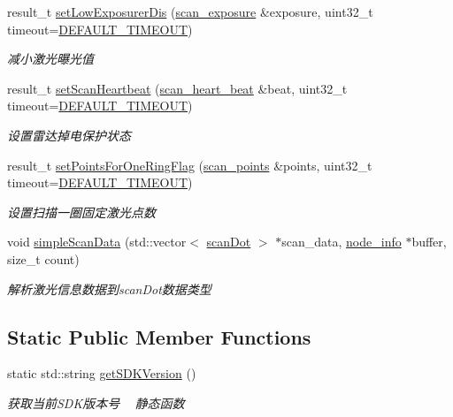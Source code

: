 \begin{DoxyCompactItemize}
result\+\_\+t \hyperlink{classydlidar_1_1_y_dlidar_driver_aece83871e5912d19bc7677676a5511f8}{set\+Low\+Exposurer\+Dis} (\hyperlink{structscan__exposure}{scan\+\_\+exposure} \&exposure, uint32\+\_\+t timeout=\hyperlink{classydlidar_1_1_y_dlidar_driver_a13a4f2dc4067b43794b2c47c06d5d27aa07c79ce96f468ff4b40495ef84584442}{D\+E\+F\+A\+U\+L\+T\+\_\+\+T\+I\+M\+E\+O\+UT})
\begin{DoxyCompactList}\small\item\em 减小激光曝光值 ~\newline
\end{DoxyCompactList}\item 
result\+\_\+t \hyperlink{classydlidar_1_1_y_dlidar_driver_ab2d5434c9b640a38f9d3b43b07c0b3eb}{set\+Scan\+Heartbeat} (\hyperlink{structscan__heart__beat}{scan\+\_\+heart\+\_\+beat} \&beat, uint32\+\_\+t timeout=\hyperlink{classydlidar_1_1_y_dlidar_driver_a13a4f2dc4067b43794b2c47c06d5d27aa07c79ce96f468ff4b40495ef84584442}{D\+E\+F\+A\+U\+L\+T\+\_\+\+T\+I\+M\+E\+O\+UT})
\begin{DoxyCompactList}\small\item\em 设置雷达掉电保护状态 ~\newline
\end{DoxyCompactList}\item 
result\+\_\+t \hyperlink{classydlidar_1_1_y_dlidar_driver_a1c8d40889885386e6c5a7827b7747696}{set\+Points\+For\+One\+Ring\+Flag} (\hyperlink{structscan__points}{scan\+\_\+points} \&points, uint32\+\_\+t timeout=\hyperlink{classydlidar_1_1_y_dlidar_driver_a13a4f2dc4067b43794b2c47c06d5d27aa07c79ce96f468ff4b40495ef84584442}{D\+E\+F\+A\+U\+L\+T\+\_\+\+T\+I\+M\+E\+O\+UT})
\begin{DoxyCompactList}\small\item\em 设置扫描一圈固定激光点数 ~\newline
\end{DoxyCompactList}\item 
void \hyperlink{classydlidar_1_1_y_dlidar_driver_a797de2678c6c81c84a8126cf184a0254}{simple\+Scan\+Data} (std\+::vector$<$ \hyperlink{structscan_dot}{scan\+Dot} $>$ $\ast$scan\+\_\+data, \hyperlink{structnode__info}{node\+\_\+info} $\ast$buffer, size\+\_\+t count)
\begin{DoxyCompactList}\small\item\em 解析激光信息数据到scan\+Dot数据类型 ~\newline
\end{DoxyCompactList}\end{DoxyCompactItemize}
\subsection*{Static Public Member Functions}
\begin{DoxyCompactItemize}
\item 
static std\+::string \hyperlink{classydlidar_1_1_y_dlidar_driver_a542dc18ac8dbcda2a51657cf9bd44ae0}{get\+S\+D\+K\+Version} ()
\begin{DoxyCompactList}\small\item\em 获取当前\+S\+D\+K版本号 ~\newline
静态函数 \end{DoxyCompactList}\end{DoxyCompactItemize}
